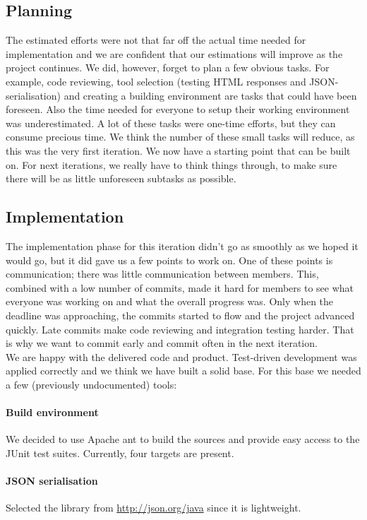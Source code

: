 \documentclass[a4paper]{article}
\begin{document}
\subsection{Planning}
The estimated efforts were not that far off the actual time needed for implementation and we are confident that our estimations will improve as the project continues. We did, however, forget to plan a few obvious tasks. For example, code reviewing, tool selection (testing HTML responses and JSON-serialisation) and creating a building environment are tasks that could have been foreseen. Also the time needed for everyone to setup their working environment was underestimated.
A lot of these tasks were one-time efforts, but they can consume precious time. We think the number of these small tasks will reduce, as this was the very first iteration. We now have a starting point that can be built on. For next iterations, we really have to think things through, to make sure there will be as little unforeseen subtasks as possible.

\pagebreak
\subsection{Implementation}
The implementation phase for this iteration didn't go as smoothly as we hoped it would go, but it did gave us a few points to work on. One of these points is communication; there was little communication between members. This, combined with a low number of commits, made it hard for members to see what everyone was working on and what the overall progress was. Only when the deadline was approaching, the commits started to flow and the project advanced quickly.
Late commits make code reviewing and integration testing harder. That is why we want to commit early and commit often in the next iteration.\\

We are happy with the delivered code and product. Test-driven development was applied correctly and we think we have built a solid base. For this base we needed a few (previously undocumented) tools:

\paragraph{Build environment}
We decided to use Apache ant to build the sources and provide easy access to the JUnit test suites. Currently, four targets are present.

\paragraph{JSON serialisation}
Selected the library from \url{http://json.org/java} since it is lightweight.
\end{document}
